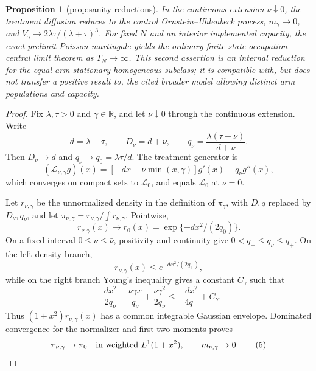 \documentclass{article}
\newtheorem{proposition}{Proposition}
\begin{document}
\begin{proposition}[prop:sanity-reductions]\label{prop:sanity-reductions}
In the continuous extension \(\nu\downarrow0\), the treatment diffusion reduces to the control Ornstein--Uhlenbeck process, \(m_\gamma\to0\), and \(V_\gamma\to2\lambda\tau/(\lambda+\tau)^3\).  For fixed \(N\) and an interior implemented capacity, the exact prelimit Poisson martingale yields the ordinary finite-state occupation central limit theorem as \(T_N\to\infty\).  This second assertion is an internal reduction for the equal-arm stationary homogeneous subclass; it is compatible with, but does not transfer a positive result to, the cited broader model allowing distinct arm populations and capacity.
\end{proposition}
\begin{proof}
Fix \(\lambda,\tau>0\) and \(\gamma\in\mathbb R\), and let \(\nu\downarrow0\) through the continuous extension.  Write
\[
 d=\lambda+\tau,
 \qquad D_\nu=d+\nu,
 \qquad q_\nu=\frac{\lambda(\tau+\nu)}{d+\nu}.                 \tag{1}
\]
Then \(D_\nu\to d\) and \(q_\nu\to q_0=\lambda\tau/d\).  The treatment generator is
\[
 (\mathcal L_{\nu,\gamma}g)(x)
 =[-dx-\nu\min(x,\gamma)]g'(x)+q_\nu g''(x),                  \tag{2}
\]
which converges on compact sets to \(\mathcal L_0\), and equals \(\mathcal L_0\) at \(\nu=0\).

Let \(r_{\nu,\gamma}\) be the unnormalized density in the definition of \(\pi_\gamma\), with \(D,q\) replaced by \(D_\nu,q_\nu\), and let \(\pi_{\nu,\gamma}=r_{\nu,\gamma}/\int r_{\nu,\gamma}\).  Pointwise,
\[
 r_{\nu,\gamma}(x)\longrightarrow
 r_0(x)=\exp\{-dx^2/(2q_0)\}.                                 \tag{3}
\]
On a fixed interval \(0\leq\nu\leq\bar\nu\), positivity and continuity give \(0<q_-\leq q_\nu\leq q_+\).  On the left density branch,
\[
 r_{\nu,\gamma}(x)\leq e^{-dx^2/(2q_+)},
\]
while on the right branch Young's inequality gives a constant \(C_\gamma\) such that
\[
 -\frac{dx^2}{2q_\nu}-\frac{\nu\gamma x}{q_\nu}
 +\frac{\nu\gamma^2}{2q_\nu}
 \leq-\frac{dx^2}{4q_+}+C_\gamma.                             \tag{4}
\]
Thus \((1+x^2)r_{\nu,\gamma}(x)\) has a common integrable Gaussian envelope.  Dominated convergence for the normalizer and first two moments proves
\[
 \pi_{\nu,\gamma}\to\pi_0
 \quad\hbox{in weighted }L^1(1+x^2),
 \qquad m_{\nu,\gamma}\to0.                                 \tag{5}
\]


\end{proof}
\end{document}
